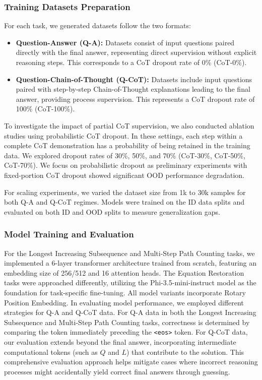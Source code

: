\subsubsection{Training Datasets Preparation}
For each task, we generated datasets follow the two formats:
\begin{itemize}
    \item \textbf{Question-Answer (Q-A):} Datasets consist of input questions paired directly with the final answer, representing direct supervision without explicit reasoning steps. This corresponds to a CoT dropout rate of 0\% (CoT-0\%).
    \item \textbf{Question-Chain-of-Thought (Q-CoT):} Datasets include input questions paired with step-by-step Chain-of-Thought explanations leading to the final answer, providing process supervision. This represents a CoT dropout rate of 100\% (CoT-100\%).
\end{itemize}

To investigate the impact of partial CoT supervision, we also conducted ablation studies using probabilistic CoT dropout. In these settings, each step within a complete CoT demonstration has a probability of being retained in the training data. We explored dropout rates of 30\%, 50\%, and 70\% (CoT-30\%, CoT-50\%, CoT-70\%).  We focus on probabilistic dropout as preliminary experiments with fixed-portion CoT dropout showed significant OOD performance degradation.

For scaling experiments, we varied the dataset size from 1k to 30k samples for both Q-A and Q-CoT regimes. Models were trained on the ID data splits and evaluated on both ID and OOD splits to measure generalization gaps.

\subsubsection{Model Training and Evaluation}
For the Longest Increasing Subsequence and Multi-Step Path Counting tasks, we implemented a 6-layer transformer architecture trained from scratch, featuring an embedding size of 256/512 and 16 attention heads. The Equation Restoration tasks were approached differently, utilizing the Phi-3.5-mini-instruct model as the foundation for task-specific fine-tuning. All model variants incorporate Rotary Position Embedding.
In evaluating model performance, we employed different strategies for Q-A and Q-CoT data. For Q-A data in both the Longest Increasing Subsequence and Multi-Step Path Counting tasks, correctness is determined by comparing the token immediately preceding the \texttt{<eos>} token. For Q-CoT data, our evaluation extends beyond the final answer, incorporating intermediate computational tokens (such as $Q$ and $L$) that contribute to the solution. This comprehensive evaluation approach helps mitigate cases where incorrect reasoning processes might accidentally yield correct final answers through guessing.


